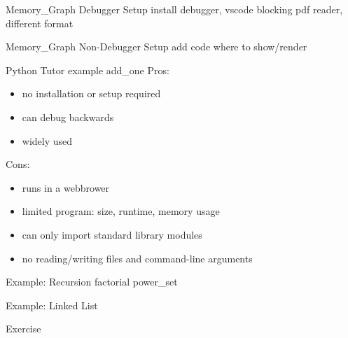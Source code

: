 \documentclass[10pt, colorlinks=true, urlcolor=blue]{beamer}
\begin{document}
\begin{frame}{Memory\_Graph Debugger Setup}
  install
  debugger, vscode
  blocking pdf reader, different format
\end{frame}

\begin{frame}{Memory\_Graph Non-Debugger Setup}
  add code where to show/render
\end{frame}

\begin{frame}{Python Tutor}
  example add\_one
  Pros:
  \begin{itemize}
  \item no installation or setup required
  \item can debug backwards
  \item widely used
  \end{itemize}
  Cons:
  \begin{itemize}
  \item runs in a webbrower
  \item limited program: size, runtime, memory usage
  \item can only import standard library modules
  \item no reading/writing files and command-line arguments 
  \end{itemize}
  
\end{frame}

\begin{frame}{Example: Recursion}
  factorial
  power\_set
\end{frame}

\begin{frame}{Example: Linked List}
\end{frame}

\begin{frame}{Exercise}
\end{frame}
\end{document}
